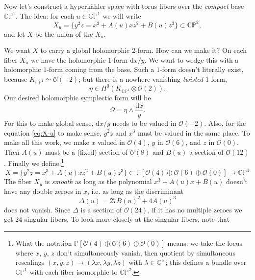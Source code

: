 \documentclass[12pt,letterpaper,reqno]{article}
\numberwithin{equation}{section}
\newcommand{\cO}{\ensuremath{\mathcal O}}
\newcommand{\C}{\ensuremath{\mathbb C}}
\newcommand{\PP}{\ensuremath{\mathbb P}}
\newcommand{\hk}{hyperk\"ahler\xspace}
\newcommand{\de}{\mathrm{d}}
\newcommand{\ti}[1]{\textit{#1}}
\begin{document}
\begin{example} \label{exa:elliptically-fibered-k3}
Now let's construct a \hk space with torus fibers over the \ti{compact}
base $\C\PP^1$. The idea: for each $u \in \C\PP^1$ we will write
\begin{equation} \label{eq:X-u}
  X_u = \{ y^2 z = x^3 + A(u) xz^2 + B(u) z^3 \} \subset \C\PP^2,
\end{equation}
and let $X$ be the union of the $X_u$.

We want $X$ to carry a global holomorphic $2$-form. How can we make it?
On each fiber $X_u$ we have the holomorphic $1$-form $\de x / y$. 
We want to wedge this with
a holomorphic $1$-form coming from the base. Such a $1$-form 
doesn't literally exist, because $K_{\C\PP^1} \simeq \cO(-2)$; but there is
a nowhere vanishing \ti{twisted} $1$-form,
\begin{equation}
  \eta \in H^0(K_{\C\PP^1} \otimes \cO(2)).
\end{equation}
Our desired holomorphic symplectic form will be
\begin{equation}
  \Omega = \eta \wedge \frac{\de x}{y}.
\end{equation}
For this to make global sense, $\de x/y$ needs to be
valued in $\cO(-2)$. Also, for the equation \eqref{eq:X-u}
to make sense, $y^2 z$ and $x^3$ must be valued in the same place.
To make all this work, we make $x$ valued in $\cO(4)$, $y$ in $\cO(6)$,
and $z$ in $\cO(0)$. Then $A(u)$ must be a (fixed) section of $\cO(8)$
and $B(u)$ a section of $\cO(12)$.
Finally we define:\footnote{What the notation $\PP[\cO(4) \oplus \cO(6) \oplus \cO(0)]$ means: we take the locus where $x$, $y$, $z$ don't 
simultaneously vanish, then quotient by simultaneous rescalings 
$(x,y,z) \to (\lambda x, \lambda y, \lambda z)$ with $\lambda \in \C^\times$; 
this defines a bundle over $\C\PP^1$ with each fiber isomorphic to $\C\PP^2$.}
\begin{equation}
  X = \{ y^2 z = x^3 + A(u) xz^2 + B(u) z^3 \} \subset \PP[\cO(4) \oplus \cO(6) \oplus \cO(0)] \to \C\PP^1
\end{equation}
The fiber $X_u$ is \ti{smooth} as long as the polynomial
$x^3 + A(u) x + B(u)$ doesn't have any double zeroes in $x$,
i.e. as long as the discriminant
\begin{equation}
  \Delta(u) = 27 B(u)^2 + 4 A(u)^3
\end{equation}
does not vanish. Since $\Delta$ is a section of $\cO(24)$,
if it has no multiple zeroes we get $24$ singular fibers. 
To look more closely at the singular fibers, note that

\end{example}
\end{document}
